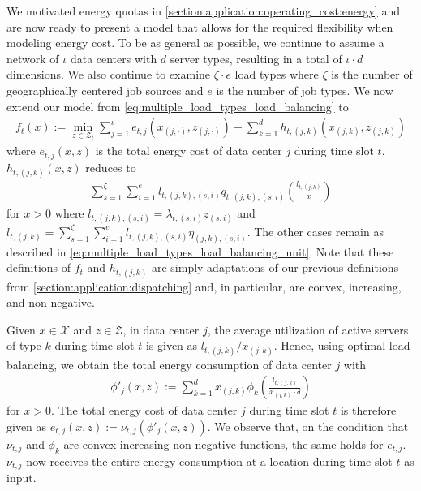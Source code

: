 We motivated energy quotas in \autoref{section:application:operating_cost:energy} and are now ready to present a model that allows for the required flexibility when modeling energy cost. To be as general as possible, we continue to assume a network of $\iota$ data centers with $d$ server types, resulting in a total of $\iota \cdot d$ dimensions. We also continue to examine $\zeta \cdot e$ load types where $\zeta$ is the number of geographically centered job sources and $e$ is the number of job types. We now extend our model from \autoref{eq:multiple_load_types_load_balancing} to \begin{align*}
    f_t(x) := \min_{z \in \mathcal{Z}_t} \sum_{j=1}^{\iota} e_{t,j}(x_{(j,\cdot)},z_{(j,\cdot)}) + \sum_{k=1}^{d} h_{t,(j,k)}(x_{(j,k)},z_{(j,k)})
\end{align*} where $e_{t,j}(x,z)$ is the total energy cost of data center $j$ during time slot $t$. $h_{t,(j,k)}(x,z)$ reduces to \begin{align*}
    \sum_{s=1}^{\zeta} \sum_{i=1}^e l_{t,(j,k),(s,i)} q_{t,(j,k),(s,i)}\left(\frac{l_{t,(j,k)}}{x}\right)
\end{align*} for $x > 0$ where $l_{t,(j,k),(s,i)} = \lambda_{t,(s,i)} z_{(s,i)}$ and $l_{t,(j,k)} = \sum_{s=1}^{\zeta} \sum_{i=1}^e l_{t,(j,k),(s,i)} \eta_{(j,k),(s,i)}$. The other cases remain as described in \autoref{eq:multiple_load_types_load_balancing_unit}. Note that these definitions of $f_t$ and $h_{t,(j,k)}$ are simply adaptations of our previous definitions from \autoref{section:application:dispatching} and, in particular, are convex, increasing, and non-negative.

Given $x \in \mathcal{X}$ and $z \in \mathcal{Z}$, in data center $j$, the average utilization of active servers of type $k$ during time slot $t$ is given as $l_{t,(j,k)} / x_{(j,k)}$. Hence, using optimal load balancing, we obtain the total energy consumption of data center $j$ with \begin{align*}
    \phi'_j(x,z) := \sum_{k=1}^{d} x_{(j,k)} \phi_{k}\left(\frac{l_{t,(j,k)}}{x_{(j,k)} \cdot \delta}\right)
\end{align*} for $x > 0$. The total energy cost of data center $j$ during time slot $t$ is therefore given as $e_{t,j}(x,z) := \nu_{t,j}(\phi'_j(x,z))$. We observe that, on the condition that $\nu_{t,j}$ and $\phi_k$ are convex increasing non-negative functions, the same holds for $e_{t,j}$. $\nu_{t,j}$ now receives the entire energy consumption at a location during time slot $t$ as input.

